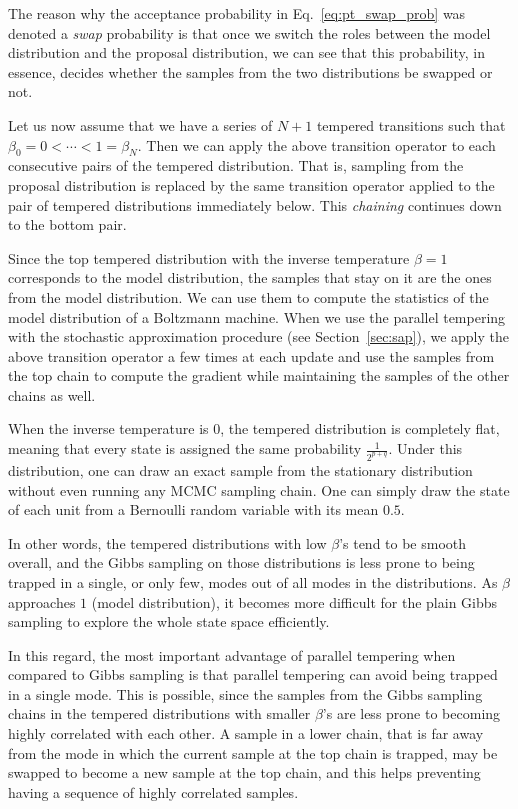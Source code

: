 \documentclass{now}
\begin{document}
The reason why the acceptance probability in
Eq.~\eqref{eq:pt_swap_prob} was denoted a \textit{swap}
probability is that once we switch the roles between the
model distribution and the proposal distribution, we can see
that this probability, in essence, decides whether the
samples from the two distributions be swapped or not.

Let us now assume that we have a series of $N+1$ tempered
transitions such that $\beta_0=0 < \cdots < 1 = \beta_N$.
Then we can apply the above transition operator to each
consecutive pairs of the tempered distribution. That is, 
sampling from the proposal distribution is replaced by the
same transition operator applied to the pair of tempered
distributions immediately below. This \textit{chaining}
continues down to the bottom pair.

Since the top tempered distribution with the inverse
temperature $\beta=1$ corresponds to the model distribution,
the samples that stay on it are the ones from the model
distribution. We can use them to compute the statistics of
the model distribution of a Boltzmann machine. When we use
the parallel tempering with the stochastic approximation
procedure (see Section~\ref{sec:sap}), we apply the above
transition operator a few times at each update and use the
samples from the top chain to compute the gradient while
maintaining the samples of the other chains as well.

When the inverse temperature is $0$, the tempered
distribution is completely flat, meaning that every state is
assigned the same probability $\frac{1}{2^{p+q}}$. Under
this distribution, one can draw an exact sample from the
stationary distribution without even running any MCMC
sampling chain. One can simply draw the state of each unit
from a Bernoulli random variable with its mean $0.5$. 

In other words, the tempered distributions with low
$\beta$'s tend to be smooth overall, and the Gibbs sampling
on those distributions is less prone to being trapped in a
single, or only few, modes out of all modes in the
distributions. As $\beta$ approaches $1$ (model
distribution), it becomes more difficult for the plain Gibbs
sampling to explore the whole state space efficiently.

In this regard, the most important advantage of parallel
tempering when compared to Gibbs sampling is that 
parallel tempering can avoid being trapped in a single mode.
This is possible, since the samples from the Gibbs sampling
chains in the tempered distributions with smaller $\beta$'s
are less prone to becoming highly correlated with each other.
A sample in a lower chain, that is far away from the mode
in which the current sample at the top chain is trapped, may be
swapped to become a new sample at the top chain, and this
helps preventing having a sequence of highly correlated
samples. 
\end{document}

